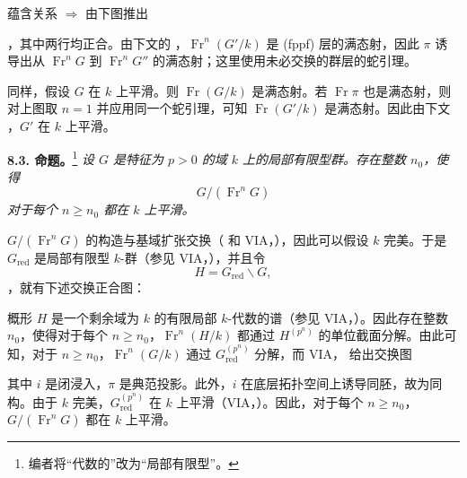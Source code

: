 蕴含关系  \(\Rightarrow\)  由下图推出
\begin{center}
  \label{sga3:VIIA:8.2-frobenius-exact-rows-diagram}
  
\end{center}
，其中两行均正合。由下文的 ，\(\operatorname{Fr}^n(G'/k)\) 是 (fppf) 层的满态射，因此 \(\pi\) 诱导出从 \(\operatorname{Fr}^nG\) 到 \(\operatorname{Fr}^nG''\) 的满态射；这里使用未必交换的群层的蛇引理。

同样，假设 \(G\) 在 \(k\) 上平滑。则 \(\operatorname{Fr}(G/k)\) 是满态射。若 \(\operatorname{Fr}\pi\) 也是满态射，则对上图取 \(n=1\) 并应用同一个蛇引理，可知 \(\operatorname{Fr}(G'/k)\) 是满态射。因此由下文 ，\(G'\) 在 \(k\) 上平滑。

\medskip
\noindent\textbf{8.3. 命题。}\footnote{编者将“代数的”改为“局部有限型”。}
\label{sga3:VIIA:8.3}
\textit{设 \(G\) 是特征为 \(p>0\) 的域 \(k\) 上的局部有限型群。存在整数 \(n_0\)，使得
\[
  G/(\operatorname{Fr}^nG)
\]
对于每个 \(n\ge n_0\) 都在 \(k\) 上平滑。}

\(G/(\operatorname{Fr}^nG)\) 的构造与基域扩张交换（ 和 VIA，），因此可以假设 \(k\) 完美。于是 \(G_{\mathrm{red}}\) 是局部有限型 \(k\)-群（参见 VIA，），并且令
\[
  H=G_{\mathrm{red}}\backslash G,
\]
，就有下述交换正合图：
\begin{center}
  \label{sga3:VIIA:8.3-reduced-quotient-frobenius-diagram}
  
\end{center}

概形 \(H\) 是一个剩余域为 \(k\) 的有限局部 \(k\)-代数的谱（参见 VIA，）。因此存在整数 \(n_0\)，使得对于每个 \(n\ge n_0\)，\(\operatorname{Fr}^n(H/k)\) 都通过 \(H^{(p^n)}\) 的单位截面分解。由此可知，对于 \(n\ge n_0\)，\(\operatorname{Fr}^n(G/k)\) 通过 \(G_{\mathrm{red}}^{(p^n)}\) 分解，而 VIA， 给出交换图
\begin{center}
  \label{sga3:VIIA:8.3-frobenius-factorization-triangle}
  
\end{center}
其中 \(i\) 是闭浸入，\(\pi\) 是典范投影。此外，\(i\) 在底层拓扑空间上诱导同胚，故为同构。由于 \(k\) 完美，\(G_{\mathrm{red}}^{(p^n)}\) 在 \(k\) 上平滑（VIA，）。因此，对于每个 \(n\ge n_0\)，\(G/(\operatorname{Fr}^nG)\) 都在 \(k\) 上平滑。

